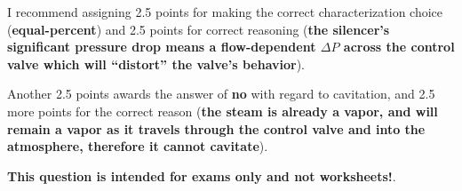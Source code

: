 





I recommend assigning 2.5 points for making the correct characterization choice ({\bf equal-percent}) and 2.5 points for correct reasoning ({\bf the silencer's significant pressure drop means a flow-dependent $\Delta P$ across the control valve which will ``distort'' the valve's behavior}).

\vskip 10pt

Another 2.5 points awards the answer of {\bf no} with regard to cavitation, and 2.5 more points for the correct reason ({\bf the steam is already a vapor, and will remain a vapor as it travels through the control valve and into the atmosphere, therefore it cannot cavitate}).







{\bf This question is intended for exams only and not worksheets!}.



